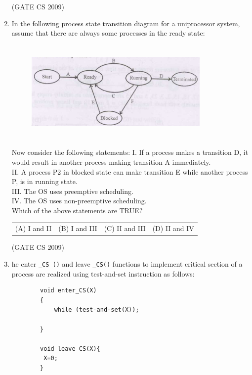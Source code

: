 \documentclass[a4paper, 11pt]{article}
\begin{document}
\begin{enumerate}
    \hfill (GATE CS 2009)

    \item In the following process state transition diagram for a uniprocessor system, assume that there are always some processes in the ready state:\\
    \begin{figure}[H]
        \centering
        \includegraphics[width=9cm , height= 5cm]{figs/q32.png}
        \caption{}
        \label{fig:placeholder}
    \end{figure}

    Now consider the following statements:
    I. If a process makes a transition D, it would result in another process making transition A immediately.\\
    II. A process P2 in blocked state can make transition E while another process P, is in running state. \\
    III.  The OS uses preemptive scheduling. \\
    IV. The OS uses non-preemptive scheduling.\\
    Which of the above statements are TRUE?\\
    \begin{tabularx}{\textwidth}{@{}XXXX@{}}
       (A) I and II  & (B) I and III & (C) II and III & (D) II and IV  \\
    \end{tabularx}

    \hfill (GATE CS 2009)

    \item he enter \verb|_CS ()| and leave \verb|_CS()| functions to implement critical section of a process are realized using test-and-set instruction as follows:\\
    \begin{lstlisting}
        void enter_CS(X)
        {
            while (test-and-set(X));
            
        }

        void leave_CS(X){
         X=0;
        }
        

\end{lstlisting}
\end{enumerate}
\end{document}
